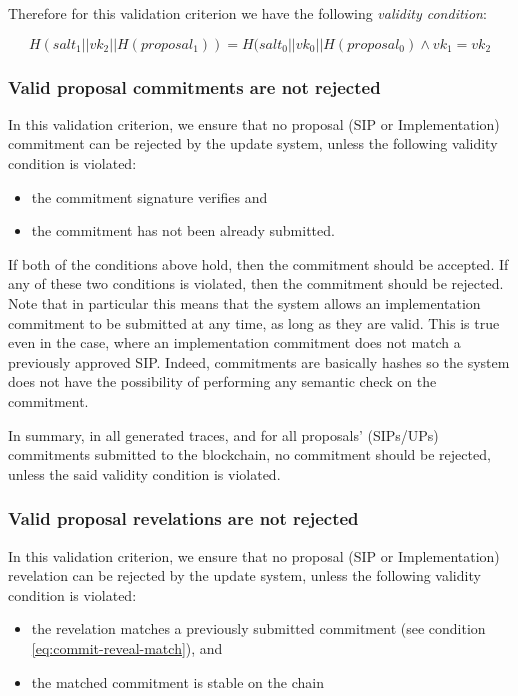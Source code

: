 Therefore for this validation criterion we have the following \emph{validity
	condition}:

\begin{equation}\label{eq:commit-reveal-match}
	H(salt_1 || vk_2 || H (proposal_1)) = H(salt_0 || vk_0 || H
	(proposal_0) \land
	vk_1 = vk_2
\end{equation}

\subsubsection{Valid proposal commitments are not
	rejected}\label{vc:commits_not_rejected}
In this validation criterion, we ensure that no proposal (SIP or
Implementation)
commitment can be rejected by the update system, unless the following validity
condition is violated:
\begin{itemize}
	\item the commitment signature verifies and
	\item the commitment has not been already submitted.
\end{itemize}

If both of the conditions above hold, then the commitment should be accepted. If
any of these two conditions is violated, then the commitment should be rejected.
Note
that in particular this means that the system allows an implementation 
commitment
to be submitted at any time, as long as they are valid. This is true even in
the case, where an implementation commitment does not match a previously 
approved
SIP. Indeed, commitments are basically hashes so the system does not have the
possibility of performing any semantic check on the commitment.

In summary, in all generated traces, and for all proposals'
(SIPs/UPs) commitments submitted to the blockchain, no commitment should be 
rejected,
unless the said validity condition is violated.


\subsubsection{Valid proposal revelations are not
	rejected}\label{vc:revelations_not_rejected}
In this validation criterion, we ensure that no proposal (SIP or
Implementation) revelation can be rejected by the update system, unless the
following validity condition is violated:
\begin{itemize}
	\item the revelation matches a previously submitted commitment (see 
	condition
	\ref{eq:commit-reveal-match}), and
	\item the matched commitment is stable on the chain
\end{itemize}

